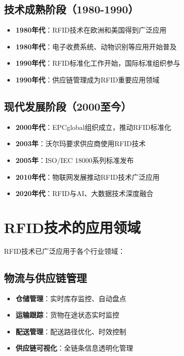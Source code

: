 \documentclass[12pt,UTF8]{ctexbook}
\begin{document}
\subsection{技术成熟阶段（1980-1990）}
\begin{itemize}[leftmargin=3.5em]
    \item \textbf{1980年代}：RFID技术在欧洲和美国得到广泛应用
    \item \textbf{1980年代}：电子收费系统、动物识别等应用开始普及
    \item \textbf{1990年代}：RFID标准化工作开始，国际标准组织参与
    \item \textbf{1990年代}：供应链管理成为RFID重要应用领域
\end{itemize}

\subsection{现代发展阶段（2000至今）}
\begin{itemize}[leftmargin=3.5em]
    \item \textbf{2000年代}：EPCglobal组织成立，推动RFID标准化
    \item \textbf{2003年}：沃尔玛要求供应商使用RFID技术
    \item \textbf{2005年}：ISO/IEC 18000系列标准发布
    \item \textbf{2010年代}：物联网发展推动RFID技术广泛应用
    \item \textbf{2020年代}：RFID与AI、大数据技术深度融合
\end{itemize}

\section{RFID技术的应用领域}

RFID技术已广泛应用于各个行业领域：

\subsection{物流与供应链管理}
\begin{itemize}[leftmargin=3.5em]
    \item \textbf{仓储管理}：实时库存监控、自动盘点
    \item \textbf{运输跟踪}：货物在途状态实时监控
    \item \textbf{配送管理}：配送路径优化、时效控制
    \item \textbf{供应链可视化}：全链条信息透明化管理
\end{itemize}
\end{document}

